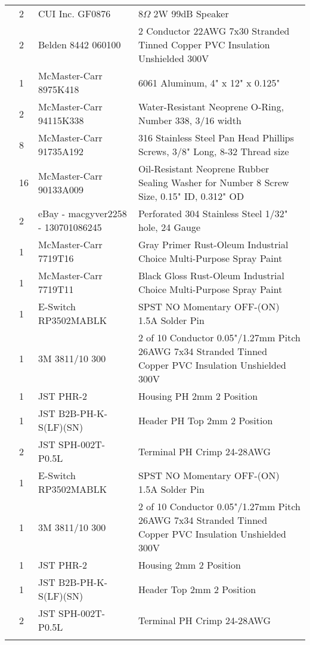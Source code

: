 \begin{longtabu}{X[3,c,m] X[1,c,m] X[3,c,m] X[5,l,m]}
   & 2 & CUI Inc. GF0876 & 8$\Omega$ 2W 99dB Speaker \\
  & 2 & Belden 8442 060100 & 2 Conductor 22AWG 7x30 Stranded Tinned Copper PVC Insulation Unshielded 300V \\
  & 1 & McMaster-Carr 8975K418 & 6061 Aluminum, 4" x 12" x 0.125" \\
  & 2 & McMaster-Carr 94115K338 & Water-Resistant Neoprene O-Ring, Number 338, 3/16 width \\
  & 8 & McMaster-Carr 91735A192 & 316 Stainless Steel Pan Head Phillips Screws, 3/8" Long, 8-32 Thread size \\
  & 16 & McMaster-Carr 90133A009 & Oil-Resistant Neoprene Rubber Sealing Washer for Number 8 Screw Size, 0.15" ID, 0.312" OD \\
  & 2 & eBay - macgyver2258 - 130701086245 & Perforated 304 Stainless Steel 1/32" hole, 24 Gauge \\
  & 1 & McMaster-Carr 7719T16 & Gray Primer Rust-Oleum Industrial Choice Multi-Purpose Spray Paint \\
  & 1 & McMaster-Carr 7719T11 & Black Gloss Rust-Oleum Industrial Choice Multi-Purpose Spray Paint \\ \mrule

   & 1 & E-Switch RP3502MABLK & SPST NO Momentary OFF-(ON) 1.5A Solder Pin \\
  & 1 & 3M 3811/10 300 & 2 of 10 Conductor 0.05"/1.27mm Pitch 26AWG 7x34 Stranded Tinned Copper PVC Insulation Unshielded 300V \\
  & 1 & JST PHR-2 & Housing PH 2mm 2 Position \\
  & 1 & JST B2B-PH-K-S(LF)(SN) & Header PH Top 2mm 2 Position \\
  & 2 & JST SPH-002T-P0.5L & Terminal PH Crimp 24-28AWG \\ \mrule

   & 1 & E-Switch RP3502MABLK & SPST NO Momentary OFF-(ON) 1.5A Solder Pin \\
  & 1 & 3M 3811/10 300 & 2 of 10 Conductor 0.05"/1.27mm Pitch 26AWG 7x34 Stranded Tinned Copper PVC Insulation Unshielded 300V \\
  & 1 & JST PHR-2 & Housing 2mm 2 Position \\
  & 1 & JST B2B-PH-K-S(LF)(SN) & Header Top 2mm 2 Position \\
  & 2 & JST SPH-002T-P0.5L & Terminal PH Crimp 24-28AWG \\ \mrule


\end{longtabu}
